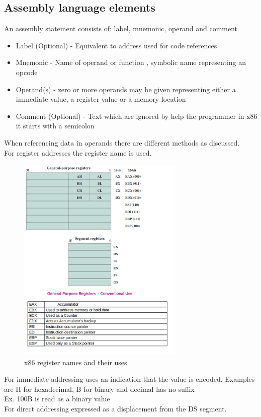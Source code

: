 \documentclass[12pt, a4paper]{article}
\begin{document}
		\subsection{Assembly language elements}
			An assembly statement consists of: label, mnemonic, operand and comment
			\begin{itemize}
				\item Label (Optional) - Equivalent to address used for code references
				\item Mnemonic - Name of operand or function , symbolic name representing an opcode
				\item Operand(s) - zero or more operands may be given representing either a immediate value, a register value or a memory location
				\item Comment (Optional) - Text which are ignored by help the programmer in x86 it starts with a semicolon
			\end{itemize}
			When referencing data in operands there are different methods as discussed. \\
			For register addresses the register name is used.
			\begin{figure}[h!]
				\includegraphics[width=300px]{assets/x86Registers.png}
				\centering
				\caption{x86 register names and their uses}
			\end{figure}
			For immediate addressing uses an indication that the value is encoded. Examples are H for hexadecimal, B for binary and decimal has no suffix\\
			Ex. 100B is read as a binary value\\
			For direct addressing expressed as a displacement from the DS segment.\\
\end{document}
